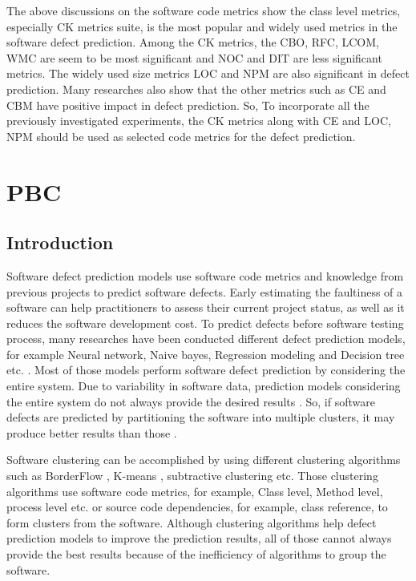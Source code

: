 \documentclass[12pt]{report}
\begin{document}
The above discussions on the software code metrics show the class level metrics, especially CK metrics suite, is the most popular and widely used metrics in the software defect prediction. Among the CK metrics, the CBO, RFC, LCOM, WMC are seem to be most significant and NOC and DIT are less significant metrics. The widely used size metrics LOC and NPM are also significant in defect prediction. Many researches also show that the other metrics such as CE and CBM have positive impact in defect prediction. So, To incorporate all the previously investigated experiments, the CK metrics along with CE and LOC, NPM should be used as selected code metrics for the defect prediction.     

\chapter{PBC}

\section{Introduction}

Software defect prediction models use software code metrics and knowledge from previous projects to predict software defects. Early estimating the faultiness of a software can help practitioners to assess their current project status, as well as it reduces the software development cost. To predict defects before software testing process, many researches have been conducted different defect prediction models, for example Neural network, Naive bayes, Regression modeling and Decision tree etc. \cite{catal2009systematic}. Most of those models perform software defect prediction by considering the entire system. Due to variability in software data, prediction models considering the entire system do not always provide the desired results \cite{bettenburg2012think}. So, if software defects are predicted by partitioning the software into multiple clusters, it may produce better results than those \cite{scanniello2013class}.

Software clustering can be accomplished by using different clustering algorithms such as BorderFlow \cite{}, K-means \cite{}, subtractive \cite{} clustering etc. Those clustering algorithms use software code metrics, for example, Class level, Method level, process level etc. or source code dependencies, for example, class reference, to form clusters from the software. Although clustering algorithms help defect prediction models to improve the prediction results, all of those cannot always provide the best results because of the inefficiency of algorithms to group the software.
\end{document}
